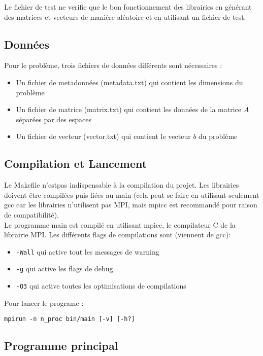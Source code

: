 \documentclass[11pt, a4paper]{article}
\begin{document}
Le fichier de test ne verifie que le bon fonctionnement des librairies en générant des matrices et vecteurs de manière aléatoire et en utilisant un fichier de test.

\subsection{Données}

Pour le problème, trois fichiers de données différents sont nécessaires :
\begin{itemize}
    \item Un fichier de metadonnées (metadata.txt) qui contient les dimensions du problème
    \item Un fichier de matrice (matrix.txt) qui contient les données de la matrice $A$ séparées par des espaces
    \item Un fichier de vecteur (vector.txt) qui contient le vecteur $b$ du problème
\end{itemize}

\subsection{Compilation et Lancement}

Le Makefile n'estpas indispensable à la compilation du projet.
Les librairies doivent \^etre compilées puis liées au main (cela peut se faire en utilisant seulement gcc car les librairies n'utilisent pas MPI, mais mpicc est recommandé pour raison de compatibilité).\\

Le programme main est compilé en utilisant mpicc, le compilateur C de la librairie MPI. Les différents flags de compilations sont (viennent de gcc): 

\begin{itemize}
    \item \texttt{-Wall} qui active tout les messages de warning
    \item \texttt{-g} qui active les flags de debug
    \item \texttt{-O3} qui active toutes les optimisations de compilations
\end{itemize}

Pour lancer le programe : 

\texttt{mpirun -n n\_proc bin/main [-v] [-h?]}

\subsection{Programme principal}
\end{document}
